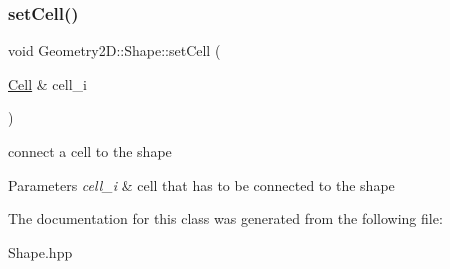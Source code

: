 \subsubsection{\texorpdfstring{set\+Cell()}{setCell()}}
{\footnotesize\ttfamily void Geometry2\+D\+::\+Shape\+::set\+Cell (\begin{DoxyParamCaption}\item[{\mbox{\hyperlink{class_cell}{Cell}} \&}]{cell\+\_\+i }\end{DoxyParamCaption})}

connect a cell to the shape 
\begin{DoxyParams}{Parameters}
{\em cell\+\_\+i} & cell that has to be connected to the shape \\
\hline
\end{DoxyParams}


The documentation for this class was generated from the following file\+:\begin{DoxyCompactItemize}
\item 
Shape.\+hpp\end{DoxyCompactItemize}
